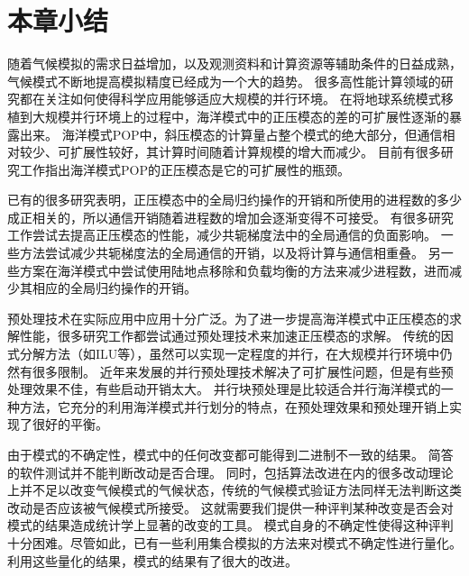 \section{本章小结}
\label{related:Conclude}

随着气候模拟的需求日益增加，以及观测资料和计算资源等辅助条件的日益成熟，气候模式不断地提高模拟精度已经成为一个大的趋势。
很多高性能计算领域的研究都在关注如何使得科学应用能够适应大规模的并行环境。 
在将地球系统模式移植到大规模并行环境上的过程中，海洋模式中的正压模态的差的可扩展性逐渐的暴露出来。 
海洋模式POP中，斜压模态的计算量占整个模式的绝大部分，但通信相对较少、可扩展性较好，其计算时间随着计算规模的增大而减少。
目前有很多研究工作指出海洋模式POP的正压模态是它的可扩展性的瓶颈。

已有的很多研究表明，正压模态中的全局归约操作的开销和所使用的进程数的多少成正相关的，所以通信开销随着进程数的增加会逐渐变得不可接受。
有很多研究工作尝试去提高正压模态的性能，减少共轭梯度法中的全局通信的负面影响。
一些方法尝试减少共轭梯度法的全局通信的开销，以及将计算与通信相重叠。 
另一些方案在海洋模式中尝试使用陆地点移除和负载均衡的方法来减少进程数，进而减少其相应的全局归约操作的开销。 

预处理技术在实际应用中应用十分广泛。为了进一步提高海洋模式中正压模态的求解性能，很多研究工作都尝试通过预处理技术来加速正压模态的求解。 
传统的因式分解方法（如ILU等），虽然可以实现一定程度的并行，在大规模并行环境中仍然有很多限制。
近年来发展的并行预处理技术解决了可扩展性问题，但是有些预处理效果不佳，有些启动开销太大。 
并行块预处理是比较适合并行海洋模式的一种方法，它充分的利用海洋模式并行划分的特点，在预处理效果和预处理开销上实现了很好的平衡。

由于模式的不确定性，模式中的任何改变都可能得到二进制不一致的结果。
简答的软件测试并不能判断改动是否合理。
同时，包括算法改进在内的很多改动理论上并不足以改变气候模式的气候状态，传统的气候模式验证方法同样无法判断这类改动是否应该被气候模式所接受。
这就需要我们提供一种评判某种改变是否会对模式的结果造成统计学上显著的改变的工具。
模式自身的不确定性使得这种评判十分困难。尽管如此，已有一些利用集合模拟的方法来对模式不确定性进行量化。
利用这些量化的结果，模式的结果有了很大的改进。 

 


